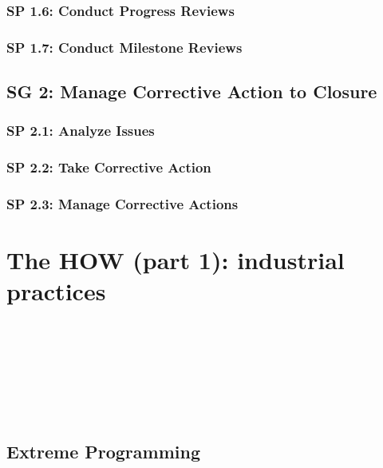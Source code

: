 \documentclass[accentcolor=tud1b]{tudbeamer}
\newcommand{\strong}[1]{\textaccentcolor{\textsf{\textbf{#1}}}}
\newenvironment*{tframe}[1][]{%
	\begin{frame}
	\ifnum\Level=2
		\frametitle{\insertsectionhead\\\strong{#1}}
	\fi\ifnum\Level=3
		\frametitle{\insertsectionhead\\\strong{\insertsubsectionhead} \textnormal{#1}}
	\fi\ifnum\Level=4
		\frametitle{\insertsubsectionhead\\\strong{\insertsubsubsectionhead} #1}
	\fi
}{%
	\end{frame}
}
\begin{document}
\subsubsection{SP 1.6: Conduct Progress Reviews}

\subsubsection{SP 1.7: Conduct Milestone Reviews}

\subsection{SG 2: Manage Corrective Action to Closure}

\subsubsection{SP 2.1: Analyze Issues}

\subsubsection{SP 2.2: Take Corrective Action}

\subsubsection{SP 2.3: Manage Corrective Actions}

\section{The HOW (part 1): industrial practices}
\begin{tframe}
	
\cite{alegria2006cmmiagile}

\end{tframe}

\subsection{Extreme Programming}
\begin{tframe}
\end{tframe}
\end{document}
